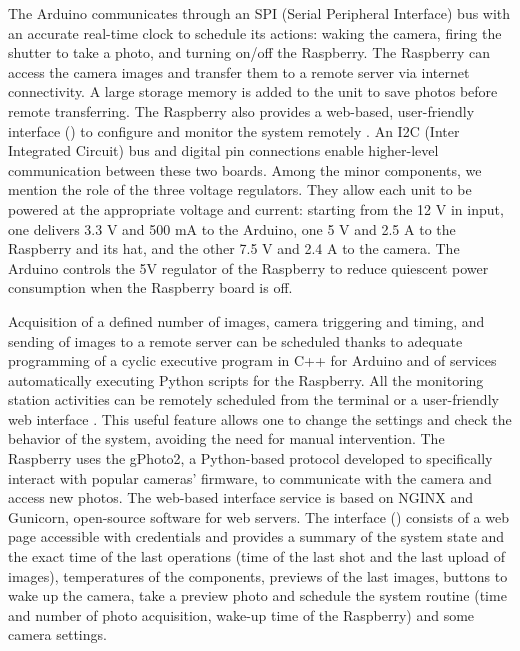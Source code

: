The Arduino communicates through an SPI (Serial Peripheral Interface) bus with an
accurate real-time clock to schedule its actions: waking the camera, firing the shutter to take a photo, and turning on/off the Raspberry. 
The Raspberry can access the camera images and transfer them to a remote server via internet connectivity. 
A large storage memory is added to the unit to save photos before remote transferring. 
The Raspberry also provides a web-based, user-friendly interface
() to configure and monitor the system remotely
\citep{greig}.
An I2C (Inter Integrated Circuit) bus and digital pin connections enable higher-level
communication between these two boards. Among the minor components, we mention the role
of the three voltage regulators. They allow each unit to be powered at the appropriate
voltage and current: starting from the 12 V in input, one delivers 3.3 V and 500 mA to
the Arduino, one 5 V and 2.5 A to the Raspberry and its hat, and the other 7.5 V and 2.4
A to the camera. The Arduino controls the 5V regulator of the Raspberry to reduce
quiescent power consumption when the Raspberry board is off.

Acquisition of a defined number of images, camera triggering and timing, and sending of
images to a remote server can be scheduled thanks to adequate programming of a cyclic
executive program in C++ for Arduino and of services automatically executing Python
scripts for the Raspberry.
All the monitoring station activities can be remotely scheduled from the terminal or a
user-friendly web interface \citep{greig}. 
This useful feature allows one to change the settings and check the behavior of the system, 
avoiding the need for manual intervention. 
The Raspberry uses the gPhoto2, a Python-based protocol developed to specifically interact with popular cameras’ firmware, to communicate with the camera and access new photos. 
The web-based interface service is based on NGINX and Gunicorn, open-source software for web servers. 
The interface () consists of a web page accessible with credentials and provides a summary of the system state and the exact time of the last operations (time of the last shot and the last upload of images), temperatures of the components, previews of the last images, buttons to wake up the camera, take a preview photo and schedule the system routine (time and number of photo acquisition, wake-up time of the Raspberry) and some camera settings.

